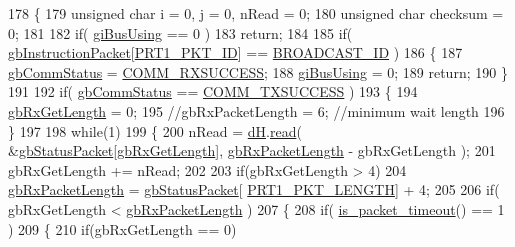 \begin{DoxyCode}
178 \{
179     \textcolor{keywordtype}{unsigned} \textcolor{keywordtype}{char} i = 0, j = 0, nRead = 0;
180     \textcolor{keywordtype}{unsigned} \textcolor{keywordtype}{char} checksum = 0;
181 
182     \textcolor{keywordflow}{if}( \hyperlink{classdynamixel_ad10e0e49f5fef04bf789a89c14cc470a}{giBusUsing} == 0 )
183         \textcolor{keywordflow}{return};
184 
185     \textcolor{keywordflow}{if}( \hyperlink{classdynamixel_afd94dcf01b8e96298727776e222de722}{gbInstructionPacket}[\hyperlink{dynamixel_8h_a3c2bb339c587abadd977eb2f14daeff9}{PRT1\_PKT\_ID}] == 
      \hyperlink{dynamixel_8h_ab9fe47395310b34fa1ceb112c9ca10e2}{BROADCAST\_ID} )
186     \{
187         \hyperlink{classdynamixel_a5b603f6bed7ccc595f1f50bd6a6ebbfc}{gbCommStatus} = \hyperlink{dynamixel_8h_a171328d9f298535c18d079f65e631434}{COMM\_RXSUCCESS};
188         \hyperlink{classdynamixel_ad10e0e49f5fef04bf789a89c14cc470a}{giBusUsing} = 0;
189         \textcolor{keywordflow}{return};
190     \}
191     
192     \textcolor{keywordflow}{if}( \hyperlink{classdynamixel_a5b603f6bed7ccc595f1f50bd6a6ebbfc}{gbCommStatus} == \hyperlink{dynamixel_8h_aac6d30f996256b24d311de81eb0f0c1e}{COMM\_TXSUCCESS} )
193     \{
194         \hyperlink{classdynamixel_a9d590ce24791d111c2db9b66be1e046d}{gbRxGetLength} = 0;
195         \textcolor{comment}{//gbRxPacketLength = 6; //minimum wait length}
196     \}
197     
198     \textcolor{keywordflow}{while}(1)
199     \{
200         nRead = \hyperlink{classdynamixel_ae003cc90ada6d7b70eaa4ea9d42d4deb}{dH}.\hyperlink{classdxl__hal_ac36331febb2eaa66303af3483795742a}{read}( &\hyperlink{classdynamixel_aa57c86d3bbbeaf5c9d4f6bd00376b04f}{gbStatusPacket}[\hyperlink{classdynamixel_a9d590ce24791d111c2db9b66be1e046d}{gbRxGetLength}], 
      \hyperlink{classdynamixel_a333686e1b5903d16c41df8172b6bd5a8}{gbRxPacketLength} - gbRxGetLength );
201         gbRxGetLength += nRead;
202 
203         \textcolor{keywordflow}{if}(gbRxGetLength > 4)
204             \hyperlink{classdynamixel_a333686e1b5903d16c41df8172b6bd5a8}{gbRxPacketLength} = \hyperlink{classdynamixel_aa57c86d3bbbeaf5c9d4f6bd00376b04f}{gbStatusPacket}[
      \hyperlink{dynamixel_8h_ab24601f91d0364e4b62edad3c2a0a5c4}{PRT1\_PKT\_LENGTH}] + 4;
205 
206         \textcolor{keywordflow}{if}( gbRxGetLength < \hyperlink{classdynamixel_a333686e1b5903d16c41df8172b6bd5a8}{gbRxPacketLength} )
207         \{
208             \textcolor{keywordflow}{if}( \hyperlink{classdynamixel_afddd976dbc486cd08b92e0e6e4117519}{is\_packet\_timeout}() == 1 )
209             \{
210                 \textcolor{keywordflow}{if}(gbRxGetLength == 0)

\end{DoxyCode}
